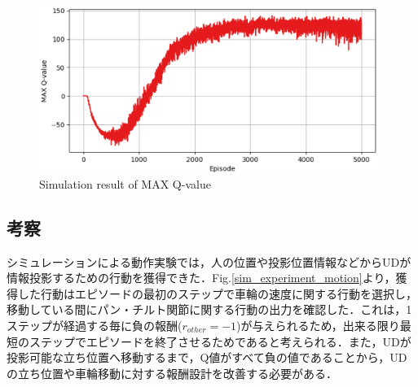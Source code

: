 \documentclass[12pt]{sonota/aislab}
\begin{document}
\begin{figure}[t]
\begin{center}
\includegraphics[clip, width=11cm]{figs/result_multi_q_value.eps}
\caption{Simulation result of MAX Q-value}
\label{result_q_value}
\end{center}
\end{figure}



\subsection{考察}
シミュレーションによる動作実験では，人の位置や投影位置情報などからUDが情報投影するための行動を獲得できた．Fig.\ref{sim_experiment_motion}より，獲得した行動はエピソードの最初のステップで車輪の速度に関する行動を選択し，移動している間にパン・チルト関節に関する行動の出力を確認した．これは，1ステップが経過する毎に負の報酬($r_{other}=-1$)が与えられるため，出来る限り最短のステップでエピソードを終了させるためであると考えられる．また，UDが投影可能な立ち位置へ移動するまで，Q値がすべて負の値であることから，UDの立ち位置や車輪移動に対する報酬設計を改善する必要がある．
\end{document}
